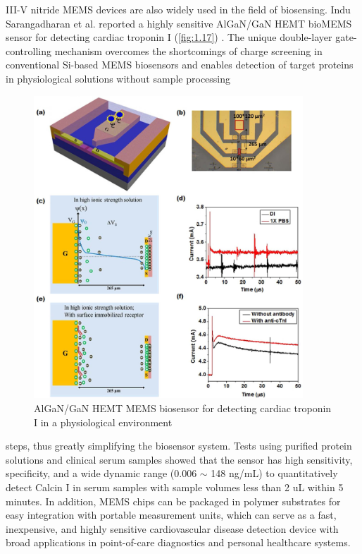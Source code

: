III-V nitride  MEMS  devices are also widely used in the field of biosensing. Indu Sarangadharan et al. reported a highly sensitive AlGaN/GaN  HEMT bioMEMS sensor for detecting cardiac troponin I (\autoref{fig:1.17}) \cite{sarangadharan2018high}. The unique double-layer gate-controlling mechanism overcomes the shortcomings of charge screening in conventional Si-based MEMS biosensors and enables detection of target proteins in physiological solutions without sample processing 


\begin{figure}[H] 
\centering    
\includegraphics[width=0.9\textwidth]{ch1_17}
\caption[AlGaN/GaN HEMT MEMS biosensor for detecting cardiac troponin I in a physiological environment]{AlGaN/GaN HEMT MEMS biosensor for detecting cardiac troponin I in a physiological environment \protect\cite{sarangadharan2018high}}
\label{fig:1.17}
\end{figure}

\noindent steps, thus greatly simplifying the biosensor system. Tests using purified protein solutions and clinical serum samples showed that the sensor has high sensitivity, specificity, and a wide dynamic range (0.006 $\sim$ 148 \unit{ng/mL}) to quantitatively detect Calcin I in serum samples with sample volumes less than 2 \unit{uL} within 5 minutes. In addition, MEMS  chips can be packaged in polymer substrates for easy integration with portable measurement units, which can serve as a fast, inexpensive, and highly sensitive cardiovascular disease detection device with broad applications in point-of-care diagnostics and personal healthcare systems.

